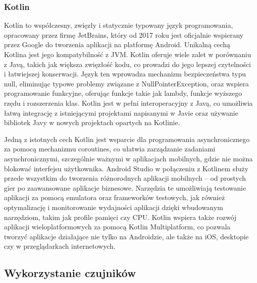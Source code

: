 \subsubsection{Kotlin}

Kotlin to współczesny, zwięzły i statycznie typowany język programowania, opracowany przez firmę JetBrains, który od 2017 roku jest oficjalnie wspierany przez Google do tworzenia aplikacji na platformę Android. Unikalną cechą Kotlina jest jego kompatybilność z JVM. Kotlin oferuje wiele zalet w porównaniu z Javą, takich jak większa zwięzłość kodu, co prowadzi do jego lepszej czytelności i łatwiejszej konserwacji. Język ten wprowadza mechanizm bezpieczeństwa typu null, eliminując typowe problemy związane z NullPointerException, oraz wspiera programowanie funkcyjne, oferując funkcje takie jak lambdy, funkcje wyższego rzędu i rozszerzenia klas. Kotlin jest w pełni interoperacyjny z Javą, co umożliwia łatwą integrację z istniejącymi projektami napisanymi w Javie oraz używanie bibliotek Javy w nowych projektach opartych na Kotlinie.

Jedną z istotnych cech Kotlin jest wsparcie dla programowania asynchronicznego za pomocą mechanizmu coroutines, co ułatwia zarządzanie zadaniami asynchronicznymi, szczególnie ważnymi w aplikacjach mobilnych, gdzie nie można blokować interfejsu użytkownika. Android Studio w połączeniu z Kotlinem służy przede wszystkim do tworzenia różnorodnych aplikacji mobilnych – od prostych gier po zaawansowane aplikacje biznesowe. Narzędzia te umożliwiają testowanie aplikacji za pomocą emulatora oraz frameworków testowych, jak również optymalizację i monitorowanie wydajności aplikacji dzięki wbudowanym narzędziom, takim jak profile pamięci czy CPU. Kotlin wspiera także rozwój aplikacji wieloplatformowych za pomocą Kotlin Multiplatform, co pozwala tworzyć aplikacje działające nie tylko na Androidzie, ale także na iOS, desktopie czy w przeglądarkach internetowych.

\subsection{Wykorzystanie czujników}

